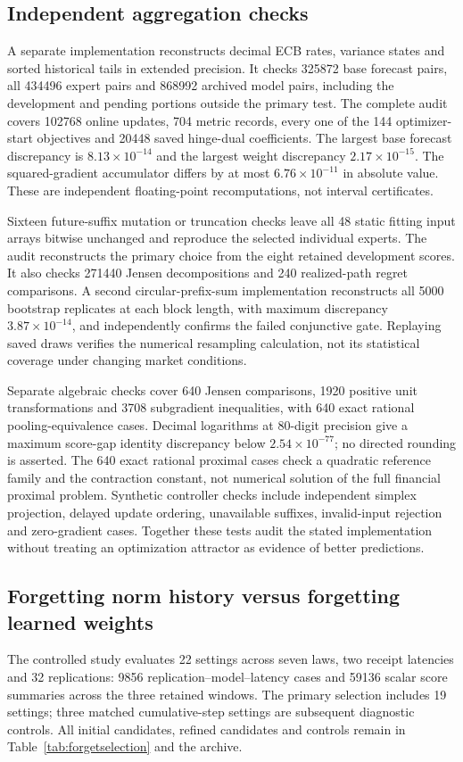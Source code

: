 \documentclass[11pt,a4paper]{article}
\theoremstyle{definition}\newtheorem{definition}[theorem]{Definition}
\begin{document}
\subsection{Independent aggregation checks}
A separate implementation reconstructs decimal ECB rates, variance states and sorted historical tails in extended precision. It checks 325872 base forecast pairs, all 434496 expert pairs and 868992 archived model pairs, including the development and pending portions outside the primary test. The complete audit covers 102768 online updates, 704 metric records, every one of the 144 optimizer-start objectives and 20448 saved hinge-dual coefficients. The largest base forecast discrepancy is $8.13\times10^{-14}$ and the largest weight discrepancy $2.17\times10^{-15}$. The squared-gradient accumulator differs by at most $6.76\times10^{-11}$ in absolute value. These are independent floating-point recomputations, not interval certificates.

Sixteen future-suffix mutation or truncation checks leave all 48 static fitting input arrays bitwise unchanged and reproduce the selected individual experts. The audit reconstructs the primary choice from the eight retained development scores. It also checks 271440 Jensen decompositions and 240 realized-path regret comparisons. A second circular-prefix-sum implementation reconstructs all 5000 bootstrap replicates at each block length, with maximum discrepancy $3.87\times10^{-14}$, and independently confirms the failed conjunctive gate. Replaying saved draws verifies the numerical resampling calculation, not its statistical coverage under changing market conditions.

Separate algebraic checks cover 640 Jensen comparisons, 1920 positive unit transformations and 3708 subgradient inequalities, with 640 exact rational pooling-equivalence cases. Decimal logarithms at 80-digit precision give a maximum score-gap identity discrepancy below $2.54\times10^{-77}$; no directed rounding is asserted. The 640 exact rational proximal cases check a quadratic reference family and the contraction constant, not numerical solution of the full financial proximal problem. Synthetic controller checks include independent simplex projection, delayed update ordering, unavailable suffixes, invalid-input rejection and zero-gradient cases. Together these tests audit the stated implementation without treating an optimization attractor as evidence of better predictions.

\subsection{Forgetting norm history versus forgetting learned weights}\label{sec:forgetresults}
The controlled study evaluates 22 settings across seven laws, two receipt latencies and 32 replications: 9856 replication--model--latency cases and 59136 scalar score summaries across the three retained windows. The primary selection includes 19 settings; three matched cumulative-step settings are subsequent diagnostic controls. All initial candidates, refined candidates and controls remain in Table~\ref{tab:forgetselection} and the archive.
\end{document}
